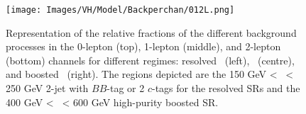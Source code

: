 \begin{figure}[h!]
    \center
    \texttt{[image: Images/VH/Model/Backperchan/012L.png]}
    \caption{Representation of the relative fractions of the different background processes in the 0-lepton (top), 1-lepton (middle), and 2-lepton (bottom) channels for different regimes: resolved \vhb\ (left), \vhc\ (centre), and boosted \vhb\ (right). The regions depicted are the 150 GeV < \ptv\ < 250 GeV 2-jet with $BB$-tag or 2 $c$-tags for the resolved SRs and the 400 GeV < \ptv\ < 600 GeV high-purity boosted SR.}
    \label{fig:backperchan}
\end{figure}
